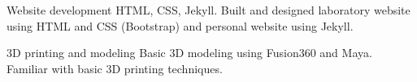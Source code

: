 

\begin{cvskills}

  \cvskill
    {Website development} %
    {HTML, CSS, Jekyll. Built and designed laboratory website using HTML and CSS (Bootstrap) and personal website using Jekyll.} %

  \cvskill
    {3D printing and modeling} %
    {Basic 3D modeling using Fusion360 and Maya. Familiar with basic 3D printing techniques.} %

\end{cvskills}
